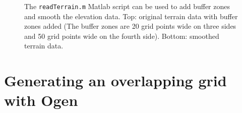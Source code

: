 \documentclass[11pt]{article}
\begin{document}


{%
\newcommand{\figWidthb}{9.cm}
\newcommand{\trimfigb}[2]{\trimPlot{#1}{#2}{.0}{.0}{.0}{.0}}
% 
\begin{figure}[hbt]
\begin{center}
\end{center}
 \caption{The {\tt readTerrain.m} Matlab script can be used to add buffer zones and smooth the elevation data.
Top: original terrain data with buffer zones added (The buffer zones are 20 grid points wide on three sides and
   50 grid points wide on the fourth side). Bottom: smoothed terrain data.}
  \label{fig:terrainSmoothBuffer}
\end{figure}
%
}%

\section{Generating an overlapping grid with Ogen} \label{sec:terrainGridGeneration}
\end{document}
